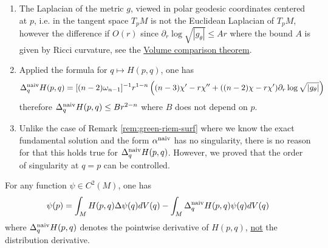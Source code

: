 \begin{remark}
\label{rem:lap-rad}
\begin{enumerate}
\item The Laplacian of the metric \(g\), viewed in polar geodesic coordinates centered at \(p\), i.e. in the
tangent space \(T_pM\) is not the Euclidean Laplacian of \(T_pM\), however the
difference if \(O(r)\) since \(\partial_r \log\sqrt{|g_\theta|} \leq Ar\) where the bound
\(A\) is given by Ricci curvature, see the \href{sobolev-riemannian.org}{Volume comparison theorem}.
\item Applied the formula for \(q \mapsto H(p,q)\), one has
\begin{equation}
\label{eq:lap-Hpq}
 \Delta_q^{\rm naiv} H(p,q) = [(n-2)\omega_{n-1}]^{-1}r^{1-n}\left( (n-3)\chi' - r \chi'' + ((n-2)\chi - r\chi') \partial_r \log\sqrt{|g_\theta|} \right)
 \end{equation}
therefore \(\Delta_q^{\rm naiv} H(p,q) \leq B r^{2-n}\) where \(B\) does not depend on \(p\).
\item Unlike the case of Remark \ref{rem:green-riem-surf} where we know the exact fundamental
solution and the form \(\alpha^{\rm naiv}\) has no singularity, there is no reason
for that this holds true for \(\Delta_q^{\rm naiv} H(p,q)\). However, we proved that
the order of singularity at \(q=p\) can be controlled.
\end{enumerate}
\end{remark}


\begin{proposition}
\label{prop:green-formula}
For any function \(\psi\in C^2(M)\), one has
\begin{equation}
\label{eq:green-formula}
 \psi(p) = \int_M H(p,q)\Delta\psi(q) dV(q) - \int_M \Delta_q^{\rm naiv} H(p,q) \psi(q) dV(q)
\end{equation}
where \(\Delta_q^{\rm naiv} H(p,q)\) denotes the pointwise derivative of \(H(p,q)\), \uline{not}
the distribution derivative.
\end{proposition}

